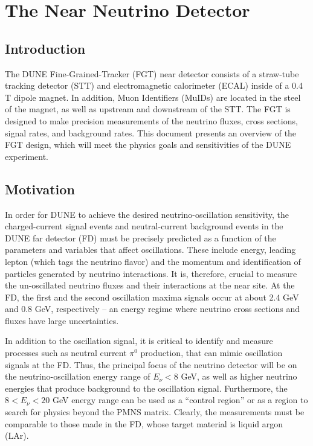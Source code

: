 
\chapter{The Near Neutrino Detector}
\label{ch:nd-nnd}

\section{Introduction} 
\label{sec:nd-nnd-intro}

The DUNE Fine-Grained-Tracker (FGT) near detector consists of a straw-tube
tracking detector (STT) and electromagnetic calorimeter (ECAL) inside of a 0.4 T
dipole magnet. In addition, Muon Identifiers (MuIDs) are located in the
steel of the magnet, as well as upstream and downstream of the STT. The FGT
is designed to make precision measurements of the neutrino fluxes, 
cross sections, signal rates, and background rates. 
This document presents an overview of the FGT design, which 
will meet the physics goals and sensitivities of the DUNE experiment. 

\section{Motivation}
\label{sec:nd-nnd-motivation}

In order for DUNE to achieve the desired neutrino-oscillation sensitivity, the 
charged-current signal events
and neutral-current
background events in the DUNE far detector (FD) must be precisely 
predicted as a function of the parameters and variables that affect 
oscillations. These include energy, leading lepton (which tags the neutrino flavor) and the 
momentum and identification of particles generated by neutrino interactions. 
It is, therefore, crucial to measure the un-oscillated neutrino fluxes and 
their interactions at the near site. At the FD, the first and the second 
oscillation maxima signals occur at about 2.4 GeV and 0.8 GeV, respectively 
-- an energy regime where neutrino cross sections and fluxes have large 
uncertainties. 

In addition to the oscillation signal, it is 
critical to identify and measure processes such as neutral current $\pi^0$ production,
that can mimic oscillation signals 
at the FD. Thus, the principal focus of the neutrino detector will be 
on the neutrino-oscillation energy range of $E_\nu < 8$ GeV, as well as higher 
neutrino energies that produce background to the oscillation signal. Furthermore, the
$8<E_\nu < 20$ GeV energy range can be used as a ``control region'' or
as a region
to search for physics beyond the PMNS matrix. Clearly, 
the measurements must be 
comparable to those made in the FD, whose target material is liquid argon (LAr). 

